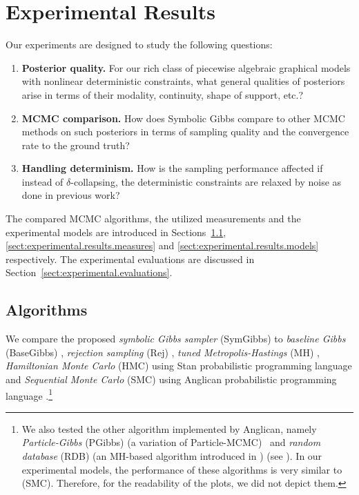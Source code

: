 \documentclass[]{article}
\begin{document}
\section{Experimental Results}
\label{sect:experimental.results}

Our experiments are designed to study the 
following questions:
\vspace{-2mm}
\begin{enumerate}[label=(\alph*)]
\item {\bf Posterior quality.} For our rich class of piecewise algebraic graphical models with nonlinear deterministic constraints, what general qualities of posteriors arise in terms of their modality, continuity, shape of support, etc.?
\item {\bf MCMC comparison.} How does Symbolic Gibbs compare to other MCMC methods on such posteriors in terms of sampling quality and the convergence rate to the ground truth?
\item {\bf Handling determinism.} How is the sampling performance affected if instead of $\delta$-collapsing, the deterministic constraints are relaxed by noise as done in previous work? 
\end{enumerate}
\vspace{-2mm}
The compared MCMC algorithms, 
the utilized measurements
and the experimental models  
are introduced in 
Sections~\ref{sect:experimental.results.algorithms},
\ref{sect:experimental.results.measures} 
and \ref{sect:experimental.results.models}
respectively.
The experimental evaluations are discussed in 
Section~\ref{sect:experimental.evaluations}.



\subsection{Algorithms} 
\label{sect:experimental.results.algorithms}
We compare the proposed \emph{symbolic Gibbs sampler} (SymGibbs) to
\emph{baseline Gibbs} (BaseGibbs) \citep{pearl1987evidential},
\emph{rejection sampling} (Rej) \citep{hammersley1964monte}, 
\emph{tuned Metropolis-Hastings} (MH) \citep{roberts1997weak}, 
\emph{Hamiltonian Monte Carlo} (HMC) using Stan probabilistic programming language  \citep{stan-manual:2014}
and \emph{Sequential Monte Carlo} (SMC) using Anglican probabilistic programming language \citep{wood2014new}.\footnote{
We also tested the other algorithm implemented by Anglican, namely 
\emph{Particle-Gibbs} (PGibbs) (a variation of Particle-MCMC\citep{andrieu2010particle}) \
and \emph{random database} (RDB) (an MH-based algorithm introduced in \citep{wingate2011lightweight}) (see \cite{wood2014new}).
In our experimental models, the performance of these algorithms is very similar to (SMC).
Therefore, for the readability of the plots, we did not depict them.
}
\end{document}

